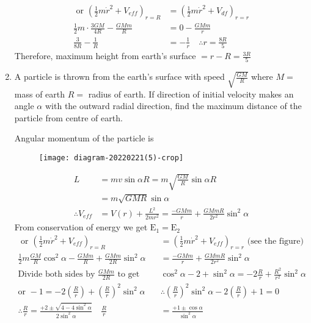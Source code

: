 \begin{enumerate}
\begin{answer}
\begin{align*}
		\text { or }\left(\frac{1}{2} m \dot{r}^{2}+V_{e f f}\right)_{r=R}&=\left(\frac{1}{2} m \dot{r}^{2}+V_{d f}\right)_{r=r} \\
		\frac{1}{2} m \cdot \frac{3 G M}{4 R}-\frac{G M m}{R}&=0-\frac{G M m}{r} \\
		\frac{3}{8 R}-\frac{1}{R}&=-\frac{1}{r} \quad \therefore r=\frac{8 R}{5}
		\end{align*}
		Therefore, maximum height from earth's surface $=r-R=\frac{3 R}{5}$
	\end{answer}
	\item  A particle is thrown from the earth's surface with speed $\sqrt{\frac{G M}{R}}$ where $M=$ mass of earth
	$R=$ radius of earth. If direction of initial velocity makes an angle $\alpha$ with the outward radial direction, find the maximum distance of the particle from centre of earth.
	\begin{answer}
		Angular momentum of the particle is
		\begin{figure}[H]
			\centering
			\texttt{[image: diagram-20220221(5)-crop]}
		\end{figure}
		\begin{align*}
		L &=m v \sin \alpha R=m \sqrt{\frac{G M}{R}} \sin \alpha R \\
		&=m \sqrt{G M R} \sin \alpha \\
		\therefore V_{e f f} &=V(r)+\frac{L^{2}}{2 m r^{2}}=\frac{-G M m}{r}+\frac{G M m R}{2 r^{2}} \sin ^{2} \alpha
		\end{align*}
		From conservation of energy we get $\mathrm{E}_{1}=\mathrm{E}_{2}$
		\begin{align*}
		\text{	or }\left(\frac{1}{2} m \dot{r}^{2}+V_{e f f}\right)_{r=R}&=\left(\frac{1}{2} m \dot{r}^{2}+V_{e f f}\right)_{r=r}\text{ (see the figure)}\\
		\frac{1}{2} m \frac{G M}{R} \cos ^{2} \alpha-\frac{G M m}{R}+\frac{G M m}{2 R} \sin ^{2} \alpha&=\frac{-G M m}{r}+\frac{G M m R}{2 r^{2}} \sin ^{2} \alpha\\
		\text{Divide both sides by }\frac{G M m}{2 R}\text{ to get }&\cos ^{2} \alpha-2+\sin ^{2} \alpha=-2 \frac{R}{r}+\frac{R^{2}}{r^{2}} \sin ^{2} \alpha\\
		\text{or }-1=-2\left(\frac{R}{r}\right)+\left(\frac{R}{r}\right)^{2} \sin ^{2} \alpha \quad &\therefore\left(\frac{R}{r}\right)^{2} \sin ^{2} \alpha-2\left(\frac{R}{r}\right)+1=0\\
		\therefore \frac{R}{r}=\frac{+2 \pm \sqrt{4-4 \sin ^{2} \alpha}}{2 \sin ^{2} \alpha} \quad \frac{R}{r}&=\frac{+1 \pm \cos \alpha}{\sin ^{2} \alpha} \\

\end{align*}
\end{answer}
\end{enumerate}

